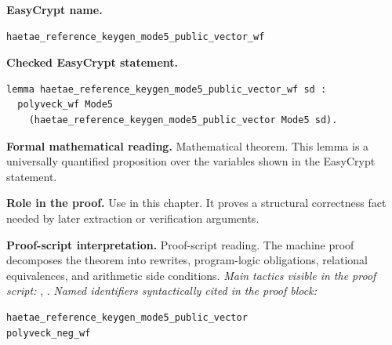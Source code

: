 \begin{formaltheorem}
\noindent\textbf{EasyCrypt name.}
\begin{lstlisting}[language=EasyCrypt,basicstyle=\ttfamily\scriptsize]
haetae_reference_keygen_mode5_public_vector_wf
\end{lstlisting}
\noindent\textbf{Checked EasyCrypt statement.}
\begin{lstlisting}[language=EasyCrypt,basicstyle=\ttfamily\scriptsize]
lemma haetae_reference_keygen_mode5_public_vector_wf sd :
  polyveck_wf Mode5
    (haetae_reference_keygen_mode5_public_vector Mode5 sd).
\end{lstlisting}
\noindent\textbf{Formal mathematical reading.}
Mathematical theorem. This lemma is a universally quantified proposition over the variables shown in the EasyCrypt statement.

\noindent\textbf{Role in the proof.}
Use in this chapter. It proves a structural correctness fact needed by later extraction or verification arguments.

\noindent\textbf{Proof-script interpretation.}
Proof-script reading. The machine proof decomposes the theorem into rewrites, program-logic obligations, relational equivalences, and arithmetic side conditions.
\emph{Main tactics visible in the proof script:} , .
\emph{Named identifiers syntactically cited in the proof block:}
\begin{lstlisting}[language=EasyCrypt,basicstyle=\ttfamily\scriptsize]
haetae_reference_keygen_mode5_public_vector
polyveck_neg_wf
\end{lstlisting}

\end{formaltheorem}

